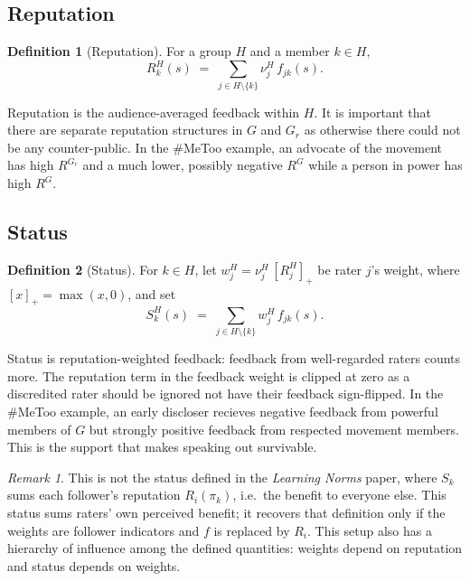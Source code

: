 \documentclass[11pt]{article}
\theoremstyle{definition}
\newtheorem{definition}{Definition}[section]
\theoremstyle{remark}
\newtheorem{remark}{Remark}[section]
\begin{document}
\subsection{Reputation}
\begin{definition}[Reputation]
For a group $H$ and a member $k \in H$,
\begin{equation}
  R_k^H(s) \;=\; \sum_{j \in H \setminus \{k\}} \nu_j^H \, f_{jk}(s).
\end{equation}
\end{definition}

Reputation is the audience-averaged feedback within $H$. It is important that there are separate reputation structures
in $G$ and $G_r$ as otherwise there could not be any counter-public. In the \#MeToo example,
an advocate of the movement has high $R^{G_r}$ and a much lower, possibly negative $R^G$
while a person in power has high $R^G$.

\subsection{Status}
\begin{definition}[Status]
For $k \in H$, let $w_j^H = \nu_j^H\,[R_j^H]_+$ be rater $j$'s weight, where $[x]_+ = \max(x,0)$, and set
\begin{equation}
  S_k^H(s) \;=\; \sum_{j \in H \setminus \{k\}} w_j^H \, f_{jk}(s).
\end{equation}
\end{definition}
Status is reputation-weighted feedback: feedback from well-regarded raters counts more.
The reputation term in the feedback weight is clipped at zero as a discredited rater
should be ignored not have their feedback sign-flipped. In the \#MeToo example,
an early discloser recieves negative feedback from powerful members of $G$
but strongly positive feedback from respected movement members. This is the support
that makes speaking out survivable.

\begin{remark}
This is not the status defined in the \textit{Learning Norms} paper, where $S_k$ sums each follower's reputation $R_i(\pi_k)$, i.e.\ the benefit to everyone else. This status sums raters' own perceived benefit; it recovers that definition only if the weights are follower indicators and $f$ is replaced by $R_i$. 
This setup also has a hierarchy of influence among the defined quantities: weights depend on reputation and status depends on weights.
\end{remark}
\end{document}
